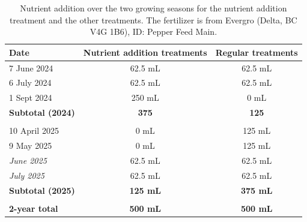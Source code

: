 \documentclass{article}
\begin{document}
\begin{table}[h]
\centering
\caption{Nutrient addition over the two growing seasons for the nutrient addition treatment and the other treatments. The fertilizer is from Evergro (Delta, BC V4G 1B6), ID: Pepper Feed Main.}
\label{tab:nutrient}
\begin{tabular}{|l|c|c|}
\hline
\textbf{Date} & \textbf{Nutrient addition treatments} & \textbf{Regular treatments} \\
\hline
7 June 2024 & 62.5 mL & 62.5 mL\\
6 July 2024 & 62.5 mL & 62.5 mL \\
1 Sept 2024 & 250 mL& 0 mL\\
\hline
\textbf{Subtotal (2024)} & \textbf{375} & \textbf{125} \\
\hline
 &  &  \\
\hline
10 April 2025 & 0 mL& 125 mL\\
9 May 2025 & 0 mL& 125 mL\\
\textit{June 2025} & 62.5 mL& 62.5 mL\\
\textit{July 2025} & 62.5 mL& 62.5 mL\\
\hline
\textbf{Subtotal (2025)} & \textbf{125 mL} & \textbf{375 mL} \\
\hline
 &  &  \\
\hline
\textbf{2-year total} & \textbf{500 mL} & \textbf{500 mL} \\
\hline
\end{tabular}
\end{table}
\end{document}
